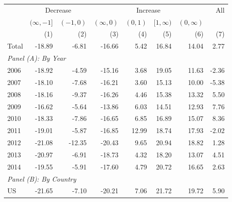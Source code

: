 \begin{table}
\begin{tabular}{lrrrrrrr}
	\hline\hline
	        & \multicolumn{2}{c}{Decrease} &                & \multicolumn{2}{c}{Increase} &                &   All \\ \cline{2-3}\cline{5-6}\cline{8-8}
	        & $ (\infty,-1] $ & $ (-1,0) $ & $ (\infty,0) $ & $ (0,1) $ &   $ [1,\infty) $ & $ (0,\infty) $ &       \\
	        &             (1) &        (2) &            (3) &       (4) &              (5) &            (6) &   (7) \\ \hline\hline
	Total   &          -18.89 &      -6.81 &         -16.66 &      5.42 &            16.84 &          14.04 &  2.77 \\ \hline\hline
	\multicolumn{8}{l}{\textit{Panel (A): By Year}}                                                                 \\ \hline
	2006    &          -18.92 &      -4.59 &         -15.16 &      3.68 &            19.05 &          11.63 & -2.36 \\
	2007    &          -18.10 &      -7.68 &         -16.21 &      3.60 &            15.13 &          10.00 & -5.38 \\
	2008    &          -18.16 &      -9.37 &         -16.26 &      4.46 &            15.38 &          13.32 &  5.50 \\
	2009    &          -16.62 &      -5.64 &         -13.86 &      6.03 &            14.51 &          12.93 &  7.76 \\
	2010    &          -18.33 &      -7.86 &         -16.65 &      6.85 &            16.89 &          15.07 &  8.36 \\
	2011    &          -19.01 &      -5.87 &         -16.85 &     12.99 &            18.74 &          17.93 & -2.02 \\
	2012    &          -21.08 &     -12.35 &         -20.43 &      9.65 &            20.94 &          18.82 &  1.28 \\
	2013    &          -20.97 &      -6.91 &         -18.73 &      4.32 &            18.20 &          13.07 &  4.51 \\
	2014    &          -19.55 &      -5.91 &         -17.60 &      4.79 &            20.72 &          16.65 &  2.63 \\ \hline
	\multicolumn{8}{l}{\textit{Panel (B): By Country}}                                                              \\ \hline
	US      &          -21.65 &      -7.10 &         -20.21 &      7.06 &            21.72 &          19.72 &  5.90 \\

\end{tabular}
\end{table}
